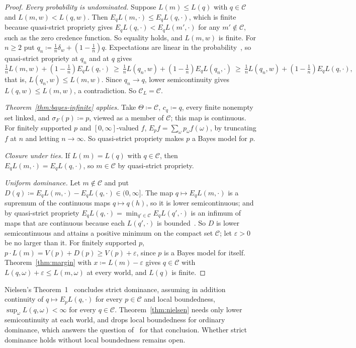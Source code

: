 \documentclass[11pt]{article}
\theoremstyle{definition}
\theoremstyle{remark}
\newcommand{\C}{\mathcal C}
\begin{document}
\begin{proof}
\emph{Every probability is undominated.} Suppose $L(m)\le L(q)$ with $q\in\C$ and $L(m,w)<L(q,w)$. Then $E_qL(m,\cdot)\le E_qL(q,\cdot)$, which is finite because quasi-strict propriety gives $E_qL(q,\cdot)<E_qL(m',\cdot)$ for any $m'\notin\C$, such as the zero credence function. So equality holds, and $L(m,w)$ is finite. For $n\ge2$ put $q_n\coloneqq\frac1n\delta_w+(1-\frac1n)q$. Expectations are linear in the probability~\cite[Appendix~A, Proposition~1]{Nielsen}, so quasi-strict propriety at $q_n$ and at $q$ gives
\[
\tfrac1nL(m,w)+(1-\tfrac1n)E_qL(q,\cdot)\ \ge\ \tfrac1nL(q_n,w)+(1-\tfrac1n)E_qL(q_n,\cdot)\ \ge\ \tfrac1nL(q_n,w)+(1-\tfrac1n)E_qL(q,\cdot),
\]
that is, $L(q_n,w)\le L(m,w)$. Since $q_n\to q$, lower semicontinuity gives $L(q,w)\le L(m,w)$, a contradiction. So $\C_L=\C$.

\emph{Theorem~\ref{thm:bayes-infinite} applies.} Take $\Theta\coloneqq\C$, $c_q\coloneqq q$, every finite nonempty set linked, and $\sigma_F(p)\coloneqq p$, viewed as a member of $\C$; this map is continuous. For finitely supported $p$ and $[0,\infty]$-valued $f$, $E_pf=\sum_\omega p_\omega f(\omega)$, by truncating $f$ at $n$ and letting $n\to\infty$. So quasi-strict propriety makes $p$ a Bayes model for $p$.

\emph{Closure under ties.} If $L(m)=L(q)$ with $q\in\C$, then $E_qL(m,\cdot)=E_qL(q,\cdot)$, so $m\in\C$ by quasi-strict propriety.

\emph{Uniform dominance.} Let $m\notin\C$ and put $D(q)\coloneqq E_qL(m,\cdot)-E_qL(q,\cdot)\in(0,\infty]$. The map $q\mapsto E_qL(m,\cdot)$ is a supremum of the continuous maps $q\mapsto q(h)$, so it is lower semicontinuous; and by quasi-strict propriety $E_qL(q,\cdot)=\min_{q'\in\C}E_qL(q',\cdot)$ is an infimum of maps that are continuous because each $L(q',\cdot)$ is bounded~\cite[Lemmas~1 and~3]{Nielsen}. So $D$ is lower semicontinuous and attains a positive minimum on the compact set $\C$; let $\varepsilon>0$ be no larger than it. For finitely supported $p$, $p\cdot L(m)=V(p)+D(p)\ge V(p)+\varepsilon$, since $p$ is a Bayes model for itself. Theorem~\ref{thm:margin} with $x\coloneqq L(m)-\varepsilon$ gives $q\in\C$ with $L(q,\omega)+\varepsilon\le L(m,\omega)$ at every world, and $L(q)$ is finite.
\end{proof}

Nielsen's Theorem~1~\cite{Nielsen} concludes strict dominance, assuming in addition continuity of $q\mapsto E_pL(q,\cdot)$ for every $p\in\C$ and local boundedness, $\sup_\omega L(q,\omega)<\infty$ for every $q\in\C$. Theorem~\ref{thm:nielsen} needs only lower semicontinuity at each world, and drops local boundedness for ordinary dominance, which answers the question of~\cite[\S4.2.1]{Nielsen} for that conclusion. Whether strict dominance holds without local boundedness remains open.
\end{document}
